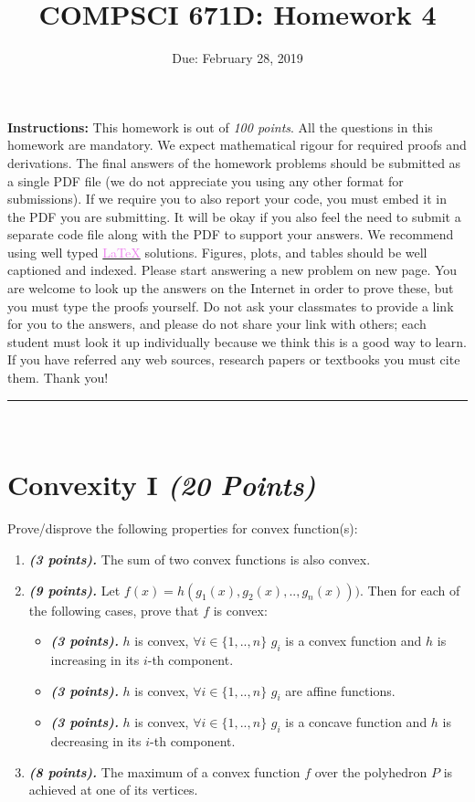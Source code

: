 \documentclass[a4paper]{article}
\title{COMPSCI 671D: Homework 4}
\date{Due: February 28, 2019}
\begin{document}
\maketitle
\textbf{Instructions:} This homework is out of \textit{100 points}. All the questions in this homework are mandatory. We expect mathematical rigour for required proofs and derivations. The final answers of the homework problems should be submitted as a single PDF file (we do not appreciate you using any other format for submissions). If we require you to also report your code, you must embed it in the PDF you are submitting. It will be okay if you also feel the need to submit a separate code file along with the PDF to support your answers. We recommend using well typed \hyperlink{https://www.latex-project.org/}{\textcolor{violet}{\LaTeX}} solutions. Figures, plots, and tables should be well captioned and indexed. Please start answering a new problem on new page. You are welcome to look up the answers on the Internet in order to prove these, but you must type the proofs yourself. Do not ask your classmates to provide a link for you to the answers, and please do not share your link with others; each student must look it up individually because we think this is a good way to learn. If you have referred any web sources, research papers or textbooks you must cite them. Thank you!
\rule{\textwidth}{0.5pt}\\
\section{Convexity I \textit{(20 Points)} }
Prove/disprove the following properties for convex function(s):
\begin{enumerate}
    \item \textbf{\textit{(3 points).}} The sum of two convex functions is also convex.
    \item \textbf{\textit{(9 points).}} Let $f(x) = h(g_1(x),g_2(x),..,g_n(x)))$. Then for each of the following cases, prove that $f$ is convex:
    \begin{itemize}
        \item \textbf{\textit{(3 points).}} $h$ is convex, $\forall i \in \{1,..,n\}$ $g_i$ is a convex function and $h$ is increasing in its $i$-th component.
        \item \textbf{\textit{(3 points).}} $h$ is convex, $\forall i \in \{1,..,n\}$ $g_i$ are affine functions.
        \item \textbf{\textit{(3 points).}} $h$ is convex, $\forall i \in \{1,..,n\}$ $g_i$ is a concave function and $h$ is decreasing in its $i$-th component.
    \end{itemize}
    \item \textbf{\textit{(8 points).}} The maximum of a convex function $f$ over the polyhedron $P$ is achieved at one of its vertices.
\end{enumerate}
\pagebreak
\end{document}
